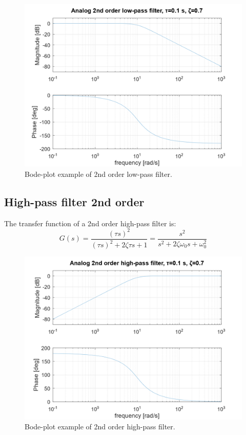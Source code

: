 \documentclass[]{book}
\begin{document}
\begin{figure}
\includegraphics[width=1\linewidth]{images/filters/lpf_2nd} \caption{Bode-plot example of 2nd order low-pass filter.}\label{fig:unnamed-chunk-3}
\end{figure}

\hypertarget{high-pass-filter-2nd-order}{%
\subsection{High-pass filter 2nd order}\label{high-pass-filter-2nd-order}}

The transfer function of a 2nd order high-pass filter is:
\[
G(s) =  \frac{(\tau s)^2}{(\tau s)^2 + 2\zeta \tau s + 1} = \frac{s^2}{s^2 + 2\zeta \omega_0 s + \omega_0^2}
\label{eq:hpf2}
\]

\begin{figure}
\includegraphics[width=1\linewidth]{images/filters/hpf_2nd} \caption{Bode-plot example of 2nd order high-pass filter.}\label{fig:unnamed-chunk-4}
\end{figure}
\end{document}
